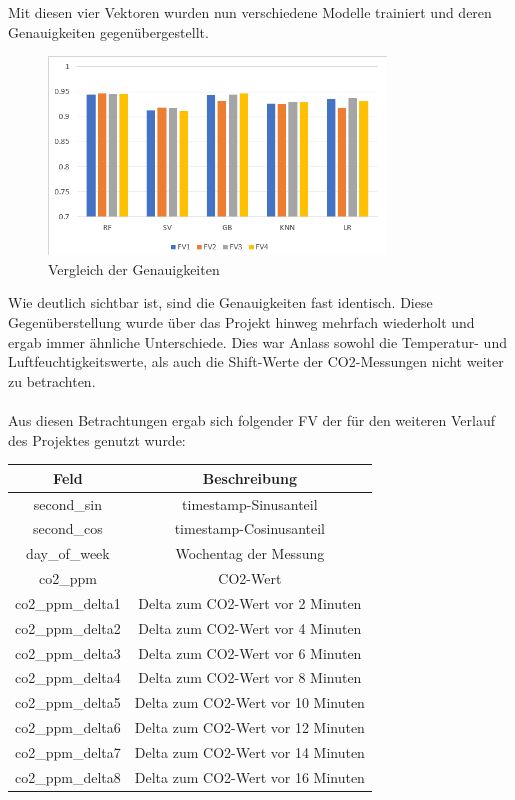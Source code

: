 Mit diesen vier Vektoren wurden nun verschiedene Modelle trainiert und deren Genauigkeiten gegenübergestellt.

\begin{figure}[h]
    \centering
    \includegraphics[width=0.8\textwidth]{pic/FV_comp.png}
    \caption{Vergleich der Genauigkeiten}
    \label{fig:FIB}
\end{figure}

Wie deutlich sichtbar ist, sind die Genauigkeiten fast identisch. Diese Gegenüberstellung wurde über das Projekt
hinweg mehrfach wiederholt und ergab immer ähnliche Unterschiede.
Dies war Anlass sowohl die Temperatur- und Luftfeuchtigkeitswerte, als auch die Shift-Werte der CO2-Messungen 
nicht weiter zu betrachten.\\\\
\newpage
Aus diesen Betrachtungen ergab sich folgender FV der für den weiteren Verlauf des Projektes genutzt wurde:\\

\begin{center}
    \begin{tabular}{ |c||c| } 
     \hline
     Feld & Beschreibung \\ 
     \hline\hline
     second\_sin & timestamp-Sinusanteil\\
     second\_cos & timestamp-Cosinusanteil\\
     day\_of\_week & Wochentag der Messung\\
     co2\_ppm & CO2-Wert\\ 
     co2\_ppm\_delta1 & Delta zum CO2-Wert vor 2 Minuten\\ 
     co2\_ppm\_delta2 & Delta zum CO2-Wert vor 4 Minuten\\ 
     co2\_ppm\_delta3 & Delta zum CO2-Wert vor 6 Minuten\\ 
     co2\_ppm\_delta4 & Delta zum CO2-Wert vor 8 Minuten\\ 
     co2\_ppm\_delta5 & Delta zum CO2-Wert vor 10 Minuten\\ 
     co2\_ppm\_delta6 & Delta zum CO2-Wert vor 12 Minuten\\ 
     co2\_ppm\_delta7 & Delta zum CO2-Wert vor 14 Minuten\\ 
     co2\_ppm\_delta8 & Delta zum CO2-Wert vor 16 Minuten\\ 
     \hline
    \end{tabular}
\end{center}

